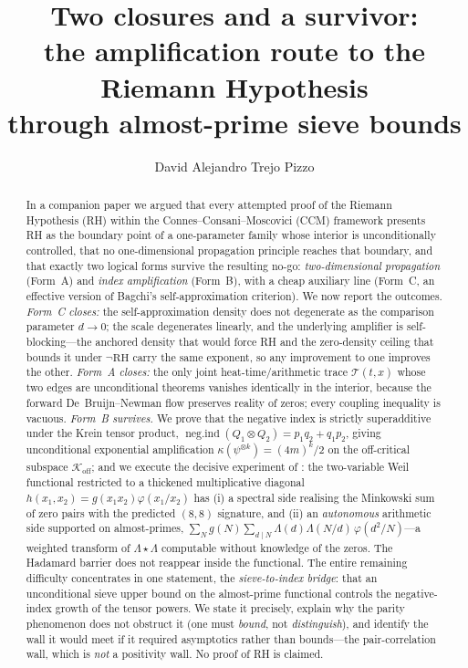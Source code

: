 \documentclass[11pt]{amsart}
\title[Two Closures and a Survivor]{Two closures and a survivor:\\
the amplification route to the Riemann Hypothesis\\
through almost-prime sieve bounds}
\author{David Alejandro Trejo Pizzo}
\theoremstyle{definition}
\theoremstyle{remark}
\newcommand{\RH}{\mathrm{RH}}
\newcommand{\Koff}{\mathcal{K}_{\mathrm{off}}}
\newcommand{\negind}{\operatorname{neg.ind}}
\begin{document}
\nocite{bgIK,bgMV,bgFI,bgTenenbaum}

\begin{abstract}
In a companion paper \cite{P41} we argued that every attempted proof of
the Riemann Hypothesis (RH) within the Connes--Consani--Moscovici (CCM)
framework presents RH as the boundary point of a one-parameter family whose
interior is unconditionally controlled, that no one-dimensional propagation
principle reaches that boundary, and that exactly two logical forms survive
the resulting no-go: \emph{two-dimensional propagation} (Form~A) and
\emph{index amplification} (Form~B), with a cheap auxiliary line
(Form~C, an effective version of Bagchi's self-approximation criterion).
We now report the outcomes. \emph{Form~C closes:} the self-approximation
density does not degenerate as the comparison parameter $d\to0$; the scale
degenerates linearly, and the underlying amplifier is self-blocking---the
anchored density that would force RH and the zero-density ceiling that
bounds it under $\neg\RH$ carry the same exponent, so any improvement to one
improves the other. \emph{Form~A closes:} the only joint heat-time/arithmetic
trace $\mathcal{T}(t,x)$ whose two edges are unconditional theorems vanishes
identically in the interior, because the forward De~Bruijn--Newman flow
preserves reality of zeros; every coupling inequality is vacuous.
\emph{Form~B survives.} We prove that the negative index is strictly
superadditive under the Krein tensor product,
$\negind(Q_1\otimes Q_2)=p_1q_2+q_1p_2$, giving unconditional exponential
amplification $\kappa(\psi^{\otimes k})=(4m)^k/2$ on the off-critical
subspace $\Koff$; and we execute the decisive experiment of \cite{P41,P40}:
the two-variable Weil functional restricted to a thickened multiplicative
diagonal $h(x_1,x_2)=g(x_1x_2)\varphi(x_1/x_2)$ has (i) a spectral side
realising the Minkowski sum of zero pairs with the predicted
$(8,8)$ signature, and (ii) an \emph{autonomous} arithmetic side supported
on almost-primes, $\sum_N g(N)\sum_{d\mid N}\Lambda(d)\Lambda(N/d)\,
\varphi(d^2/N)$---a weighted transform of $\Lambda\star\Lambda$ computable
without knowledge of the zeros. The Hadamard barrier does not reappear
inside the functional. The entire remaining difficulty concentrates in one
statement, the \emph{sieve-to-index bridge}: that an unconditional sieve
upper bound on the almost-prime functional controls the negative-index
growth of the tensor powers. We state it precisely, explain why the parity
phenomenon does not obstruct it (one must \emph{bound}, not
\emph{distinguish}), and identify the wall it would meet if it required
asymptotics rather than bounds---the pair-correlation wall, which is
\emph{not} a positivity wall. No proof of RH is claimed.
\end{abstract}
\end{document}
